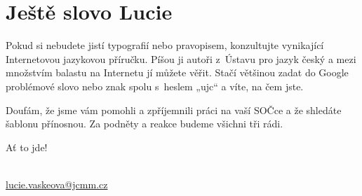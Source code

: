 \chapter{Ještě slovo Lucie}
Pokud si nebudete jistí typografií nebo pravopisem, konzultujte vynikající Internetovou jazykovou příručku.
Píšou ji autoři z~Ústavu pro jazyk český a mezi množstvím balastu na Internetu jí můžete věřit.
Stačí většinou zadat do Google problémové slovo nebo znak spolu s~heslem „ujc“ a víte, na čem jste.

Doufám, že jsme vám pomohli a zpříjemnili práci na vaší SOČce a že shledáte šablonu přínosnou.
Za podněty a reakce budeme všichni tři rádi.

\vspace{\baselineskip}
\noindent Ať to jde!

\vspace{\baselineskip}
\noindent {} \\
\url{lucie.vaskeova@jcmm.cz}